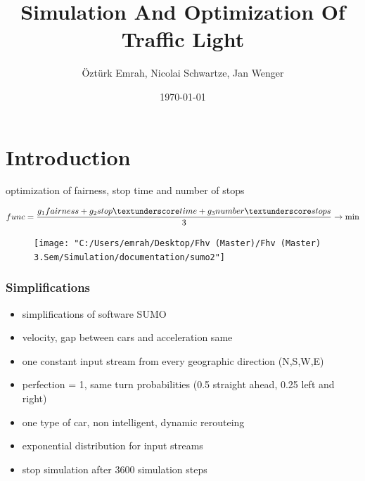 \documentclass{beamer}
\title{Simulation And Optimization Of Traffic Light}
\author{Öztürk Emrah, Nicolai Schwartze, Jan Wenger}
\date{\today}
\begin{document}
	\maketitle
	
	\section{Introduction}
	\frame{\tableofcontents[currentsection]}
	\begin{frame}
		optimization of fairness, stop time and number of stops

		\begin{equation*}\label{key}
		func = \frac{g_{1}fairness + g_{2}stop\textunderscore time+g_{3}number\textunderscore stops}{3}\rightarrow \min
		\end{equation*}
		
		\begin{figure}[H]
			\centering
			\texttt{[image: "C:/Users/emrah/Desktop/Fhv (Master)/Fhv (Master) 3.Sem/Simulation/documentation/sumo2"]}
			\label{fig:sumo2}
		\end{figure}
	\end{frame}

	\begin{frame}
	\frametitle{Simplifications}
		\begin{itemize}
			\item simplifications of software SUMO
			\item velocity, gap between cars and acceleration same
			\item one constant input stream from every geographic direction (N,S,W,E)
			\item perfection = 1, same turn probabilities (0.5 straight ahead, 0.25 left and right)
			\item one type of car, non intelligent, dynamic rerouteing
			\item exponential distribution for input streams
			\item stop simulation after 3600 simulation steps
		\end{itemize}
		
	\end{frame}
	
%		
%	
%
\end{document}
